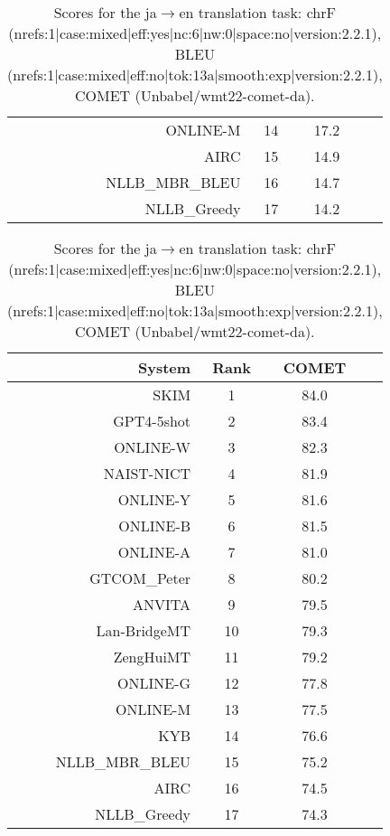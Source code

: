 \documentclass[11pt]{article}
\begin{document}
\begin{table}
\begin{subtable}[t]{0.33\textwidth}
\begin{tabular}{rccc}
ONLINE-M & 14 & 17.2 \\ 
AIRC & 15 & 14.9 \\ 
NLLB\_MBR\_BLEU & 16 & 14.7 \\ 
NLLB\_Greedy & 17 & 14.2 \\ 
\bottomrule 
\end{tabular} 
\end{subtable} 
\begin{subtable}[t]{0.33\textwidth}
\begin{tabular}{rccc}
\toprule 
System & Rank & COMET \\ 
\midrule 
SKIM & 1 & 84.0 \\ 
GPT4-5shot & 2 & 83.4 \\ 
ONLINE-W & 3 & 82.3 \\ 
NAIST-NICT & 4 & 81.9 \\ 
ONLINE-Y & 5 & 81.6 \\ 
ONLINE-B & 6 & 81.5 \\ 
ONLINE-A & 7 & 81.0 \\ 
GTCOM\_Peter & 8 & 80.2 \\ 
ANVITA & 9 & 79.5 \\ 
Lan-BridgeMT & 10 & 79.3 \\ 
ZengHuiMT & 11 & 79.2 \\ 
ONLINE-G & 12 & 77.8 \\ 
ONLINE-M & 13 & 77.5 \\ 
KYB & 14 & 76.6 \\ 
NLLB\_MBR\_BLEU & 15 & 75.2 \\ 
AIRC & 16 & 74.5 \\ 
NLLB\_Greedy & 17 & 74.3 \\ 
\bottomrule 
\end{tabular} 
\end{subtable} 
\caption{Scores for the ja$\rightarrow$en translation task: chrF (nrefs:1|case:mixed|eff:yes|nc:6|nw:0|space:no|version:2.2.1), BLEU (nrefs:1|case:mixed|eff:no|tok:13a|smooth:exp|version:2.2.1), COMET (Unbabel/wmt22-comet-da).} 
\end{table} 
\end{document}
